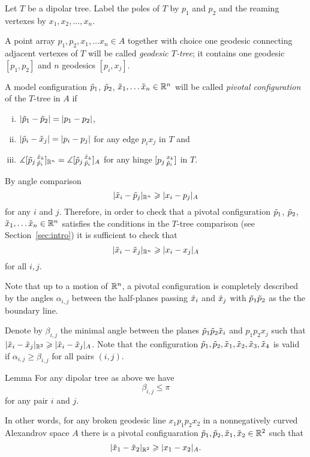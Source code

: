 Let $T$ be a dipolar tree.
Label the poles of $T$ by $p_1$ and $p_2$ and the reaming vertexes by $x_1,x_2,\dots,x_n$.

A point array $p_1,p_2,x_1,\dots x_n\in A$ together with choice one geodesic connecting adjacent vertexes of $T$ will be called \emph{geodesic $T$-tree};
it contains one geodesic $[p_1,p_2]$ and $n$ geodesics  $[p_i,x_j]$.

A model configuration $\~p_1$, $\~p_2$, $\~x_1,\dots\~x_n\in \RR^n$ will be called \emph{pivotal configuration} of the $T$-tree in $A$
if 
\begin{enumerate}[(i)]
\item $|\~p_1-\~p_2|= |p_1-p_2|$,
\item $|\~p_i-\~x_j|= |p_i-p_j|$ for any edge $p_ix_j$ in $T$ and
\item $\measuredangle[\~p_j\,^{\~x_k}_{\~p_i}]_{\RR^n}=\measuredangle[\~p_j\,^{\~x_k}_{\~p_i}]_A$
for any hinge  $[p_j\,^{x_k}_{\~p_i}]$ in $T$.
\end{enumerate}

By angle comparison 
\[|\~x_i-\~p_j|_{\RR^n}\ge |x_i-p_j|_A\]
for any $i$ and $j$.
Therefore, in order to check that a pivotal configuration $\~p_1$, $\~p_2$, $\~x_1,\dots\~x_n\in \RR^n$ satisfies the conditions in the $T$-tree comparison (see Section~\ref{sec:intro}) it is sufficient to check that 
\[|\~x_i-\~x_j|_{\RR^n}\ge |x_i-x_j|_A\]
for all $i,j$.

Note that up to a motion of $\RR^n$, a pivotal configuration is completely described by the angles $\alpha_{i,j}$ between the half-planes passing $\~x_i$ and $\~x_j$ with $\~p_1 \~p_2$ as the the boundary line.

Denote by $\beta_{i,j}$ the minimal angle between the planes $\~p_1 \~p_2 \~x_i$ and $p_1p_2 x_j$ such that $|\~x_i-\~x_j|_{\RR^3}\ge|\~x_i-\~x_j|_A$. 
Note that the configuration $\~p_1,\~p_2,\~x_1,\~x_2,\~x_3,\~x_4$ is valid if $\alpha_{i,j}\ge \beta_{i,j}$ for all pairs $(i,j)$.


\begin{thm}{Lemma}\label{|x-x|}
For any dipolar tree as above we have 
\[\beta_{i,j}\le \pi\]
for any pair $i$ and $j$.

In other words, for any broken geodesic line $x_1p_1p_2x_2$ in a nonnegatively curved Alexandrov space $A$ there is a pivotal configuaration $\~p_1,\~p_2,\~x_1,\~x_2\in \RR^2$ such that 
\[|\~x_1-\~x_2|_{\RR^2}\ge |x_1-x_2|_A.\]

\end{thm}

